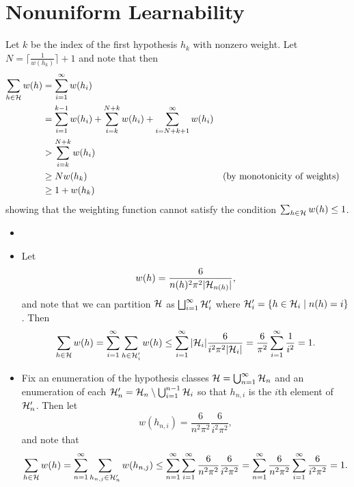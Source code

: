 \chapter{Nonuniform Learnability}

\begin{ex}
\end{ex}

\begin{ex}
  Let $k$ be the index of the first hypothesis $h_k$ with nonzero weight. Let
  $N=\lceil \frac{1}{w(h_k)} \rceil +1$ and note that then
  \begin{align*}
    \sum_{h\in\mathcal{H}} w(h)
     & =\sum_{i=1}^\infty w(h_i)                                                                  \\
     & =\sum_{i=1}^{k-1} w(h_i) +\sum_{i=k}^{N+k} w(h_i)
    +\sum_{i=N+k+1}^\infty w(h_i)                                                                 \\
     & > \sum_{i=k}^{N+k} w(h_i)                                                                  \\
     & \geq N w(h_k)                                     &  & \text{(by monotonicity of weights)} \\
     & \geq 1 + w(h_k)
  \end{align*}
  showing that the weighting function cannot satisfy the condition
  $\sum_{h\in\mathcal{H}}w(h)\leq 1$.
\end{ex}

\begin{ex}
  \begin{itemize}
    \item[]
    \item Let
          \[
            w(h)=\frac{6}{n(h)^2\pi^2|\mathcal{H}_{n(h)}|},
          \]
          and note that we can partition $\mathcal{H}$ as
          $\bigsqcup_{i=1}^\infty \mathcal{H}'_i$
          where $\mathcal{H}'_i=\{h\in \mathcal{H}_i \mid n(h) = i\}$. Then
          \begin{align*}
            \sum_{h\in\mathcal{H}} w(h)
            = \sum_{i=1}^\infty\sum_{h\in \mathcal{H}'_i} w(h)
            \leq \sum_{i=1}^\infty |\mathcal{H}_i| \frac{6}{i^2 \pi^2 |\mathcal{H}_i|}
            =\frac{6}{\pi^2}\sum_{i=1}^\infty \frac{1}{i^2} = 1.
          \end{align*}
    \item Fix an enumeration of the hypothesis classes
          $\mathcal{H}=\bigcup_{n=1}^\infty\mathcal{H}_n$ and an enumeration of each
          $\mathcal{H}_n'=\mathcal{H}_n\setminus \bigcup_{i=1}^{n-1}\mathcal{H}_i$ so that $h_{n,i}$ is the
          $i$th element of $\mathcal{H}_n'$. Then let
          \[
            w(h_{n,i})=\frac{6}{n^2\pi^2}\frac{6}{i^2\pi^2},
          \]
          and note that
          \begin{align*}
            \sum_{h\in\mathcal{H}} w(h)
            = \sum_{n=1}^\infty\sum_{h_{n,j}\in \mathcal{H}'_n} w(h_{n,j})
            \leq \sum_{n=1}^\infty\sum_{i=1}^\infty
            \frac{6}{n^2 \pi^2} \frac{6}{i^2 \pi^2}
            =\sum_{n=1}^\infty \frac{6}{n^2 \pi^2}
            \sum_{i=1}^\infty \frac{6}{i^2 \pi^2}
            =1.
          \end{align*}
  \end{itemize}
\end{ex}

\begin{ex}
\end{ex}

\begin{ex}
\end{ex}

\begin{ex}
\end{ex}